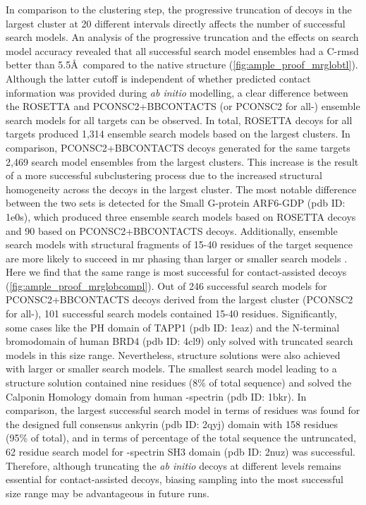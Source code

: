 In comparison to the clustering step, the progressive truncation of decoys in the largest cluster at 20 different intervals directly affects the number of successful search models. An analysis of the progressive truncation and the effects on search model accuracy revealed that all successful search model ensembles had a C\textalpha-\gls{rmsd} better than 5.5\AA\ compared to the native structure (\cref{fig:ample_proof_mrglobtl}). Although the latter cutoff is independent of whether predicted contact information was provided during \textit{ab initio} modelling, a clear difference between the ROSETTA and PCONSC2+BBCONTACTS (or PCONSC2 for all-\textalpha) ensemble search models for all targets can be observed. In total, ROSETTA decoys for all targets produced 1,314 ensemble search models based on the largest clusters. In comparison, PCONSC2+BBCONTACTS decoys generated for the same targets 2,469 search model ensembles from the largest clusters. This increase is the result of a more successful subclustering process due to the increased structural homogeneity across the decoys in the largest cluster. The most notable difference between the two sets is detected for the Small G-protein ARF6-GDP (\gls{pdb} ID: 1e0s), which produced three ensemble search models based on ROSETTA decoys and 90 based on PCONSC2+BBCONTACTS decoys. Additionally, ensemble search models with structural fragments of 15-40 residues of the target sequence are more likely to succeed in \gls{mr} phasing than larger or smaller search models \cite{Bibby2012-lm}. Here we find that the same range is most successful for contact-assisted decoys (\cref{fig:ample_proof_mrglobcompl}). Out of 246 successful search models for PCONSC2+BBCONTACTS decoys derived from the largest cluster (PCONSC2 for all-\textalpha), 101 successful search models contained 15-40 residues. Significantly, some cases like the PH domain of TAPP1 (\gls{pdb} ID: 1eaz) and the N-terminal bromodomain of human BRD4 (\gls{pdb} ID: 4cl9) only solved with truncated search models in this size range. Nevertheless, structure solutions were also achieved with larger or smaller search models. The smallest search model leading to a structure solution contained nine residues (8\% of total sequence) and solved the Calponin Homology domain from human \textbeta-spectrin (\gls{pdb} ID: 1bkr). In comparison, the largest successful search model in terms of residues was found for the designed full consensus ankyrin (\gls{pdb} ID: 2qyj) domain with 158 residues (95\% of total), and in terms of percentage of the total sequence the untruncated, 62 residue search model for \textalpha-spectrin SH3 domain (\gls{pdb} ID: 2nuz) was successful. Therefore, although truncating the \textit{ab initio} decoys at different levels remains essential for contact-assisted decoys, biasing sampling into the most successful size range may be advantageous in future runs.

